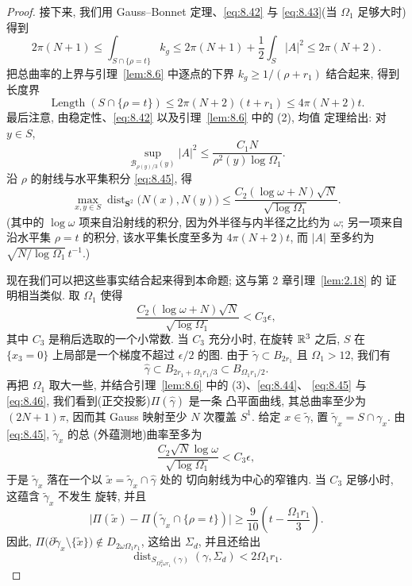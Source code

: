 \begin{proof}
接下来, 我们用 Gauss--Bonnet 定理、\eqref{eq:8.42} 与 \eqref{eq:8.43}(当
$\Omega_1$ 足够大时)得到
\begin{equation}
2\pi(N+1)\leq\int_{S\cap\{\rho=t\}}k_g
\leq2\pi(N+1)+\frac12\int_S|A|^2\leq2\pi(N+2).
\label{eq:8.44}
\end{equation}
把总曲率的上界与引理~\ref{lem:8.6} 中逐点的下界
$k_g\geq1/(\rho+r_1)$ 结合起来, 得到长度界
\[
\operatorname{Length}(S\cap\{\rho=t\})\leq2\pi(N+2)(t+r_1)
\leq4\pi(N+2)t.
\]
最后注意, 由稳定性、\eqref{eq:8.42} 以及引理~\ref{lem:8.6} 中的 (2), 均值
定理给出: 对 $y\in S$,
\begin{equation}
\sup_{\mathcal{B}_{\rho(y)/3}(y)}|A|^2
\leq\frac{C_1N}{\rho^2(y)\log\Omega_1}.
\label{eq:8.45}
\end{equation}
沿 $\rho$ 的射线与水平集积分 \eqref{eq:8.45}, 得
\begin{equation}
\max_{x,y\in S}\operatorname{dist}_{\mathbf{S}^2}\bigl(N(x),N(y)\bigr)
\leq\frac{C_2(\log\omega+N)\sqrt{N}}{\sqrt{\log\Omega_1}}.
\label{eq:8.46}
\end{equation}
(其中的 $\log\omega$ 项来自沿射线的积分, 因为外半径与内半径之比约为 $\omega$;
另一项来自沿水平集 $\rho=t$ 的积分, 该水平集长度至多为 $4\pi(N+2)t$, 而
$|A|$ 至多约为 $\sqrt{N/\log\Omega_1}\,t^{-1}$.)

现在我们可以把这些事实结合起来得到本命题; 这与第 2 章引理~\ref{lem:2.18} 的
证明相当类似. 取 $\Omega_1$ 使得
\[
\frac{C_2(\log\omega+N)\sqrt{N}}{\sqrt{\log\Omega_1}}<C_3\epsilon,
\]
其中 $C_3$ 是稍后选取的一个小常数. 当 $C_3$ 充分小时, 在旋转 $\mathbb{R}^3$ 之后, $S$
在 $\{x_3=0\}$ 上局部是一个梯度不超过 $\epsilon/2$ 的图. 由于
$\tilde\gamma\subset B_{2r_1}$ 且 $\Omega_1>12$, 我们有
\[
\hat\gamma\subset B_{2r_1+\Omega_1r_1/3}\subset B_{\Omega_1r_1/2}.
\]
再把 $\Omega_1$ 取大一些, 并结合引理~\ref{lem:8.6} 中的 (3)、\eqref{eq:8.44}、
\eqref{eq:8.45} 与 \eqref{eq:8.46}, 我们看到(正交投影)$\Pi(\hat\gamma)$ 是一条
凸平面曲线, 其总曲率至少为 $(2N+1)\pi$, 因而其 Gauss 映射至少 $N$ 次覆盖
$S^1$. 给定 $x\in\tilde\gamma$, 置
$\tilde\gamma_x=S\cap\gamma_x$. 由 \eqref{eq:8.45}, $\tilde\gamma_x$ 的总
(外蕴测地)曲率至多为
\[
\frac{C_2\sqrt{N}\log\omega}{\sqrt{\log\Omega_1}}<C_3\epsilon,
\]
于是 $\tilde\gamma_x$ 落在一个以 $\tilde{x}=\tilde\gamma_x\cap\hat\gamma$ 处的
切向射线为中心的窄锥内. 当 $C_3$ 足够小时, 这蕴含 $\tilde\gamma_x$ 不发生
旋转, 并且
\begin{equation}
\bigl|\Pi(\tilde{x})-\Pi(\tilde\gamma_x\cap\{\rho=t\})\bigr|
\geq\frac9{10}\left(t-\frac{\Omega_1r_1}{3}\right).
\label{eq:8.47}
\end{equation}
因此, $\Pi\bigl(\partial\tilde\gamma_x\setminus\{\tilde{x}\}\bigr)\notin
D_{2\omega\Omega_1r_1}$, 这给出 $\Sigma_d$, 并且还给出
\[
\operatorname{dist}_{S_{\Omega_1^2\omega r_1}(\gamma)}(\gamma,\Sigma_d)
<2\Omega_1r_1.
\]
\end{proof}

